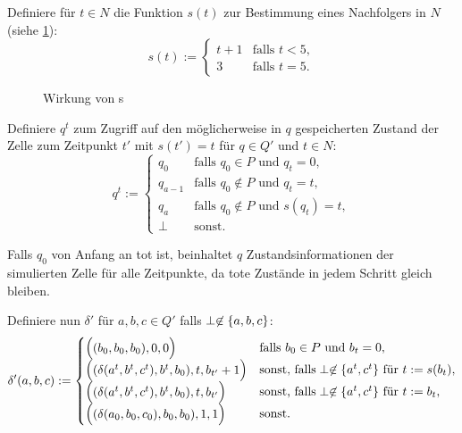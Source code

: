 \begin{definition}
    Definiere für $t \in N$ die Funktion $s(t)$ zur Bestimmung eines Nachfolgers in $N$ (siehe \cref{wirkungVonS}):
    \[
        s(t) :=
        \begin{cases}
            t + 1 & \text{falls } t < 5, \\
            3 & \text{falls } t = 5.
        \end{cases}
    \]
    
    \begin{figure}[h]
        \centering
        
        \caption{Wirkung von s}
        \label{wirkungVonS}
    \end{figure}
    
    
    Definiere $q^t$ zum Zugriff auf den möglicherweise in $q$ gespeicherten Zustand der Zelle zum Zeitpunkt $t'$ mit $s(t') = t$
    für $q \in Q'$ und $t \in N$:
    \[
        q^{t} :=
        \begin{cases}
            q_{0} & \text{falls } q_0 \in P \text{ und } q_t = 0, \\
            q_{a-1} & \text{falls } q_0 \not\in P \text{ und } q_t = t, \\
            q_a & \text{falls } q_0 \not\in P \text{ und } s(q_t) = t, \\
            \perp & \text{sonst.}
        \end{cases}
    \]
    
    Falls $q_0$ von Anfang an tot ist,
    beinhaltet $q$ Zustandsinformationen
    der simulierten Zelle für alle Zeitpunkte,
    da tote Zustände in jedem Schritt gleich bleiben.
    
    Definiere nun $\delta'$ für $a, b, c \in Q'$ falls $\perp \not\in \{ { a, b, c} \}$:
    \[
        \delta'(a, b, c) := 
        \begin{cases}
            \Spvek{(b_0, b_0, b_0), 0, 0}
            & \text{falls } b_0 \in P \text{ und } b_t = 0, \\
            \Spvek{(\delta(a^t, b^t, c^t), b^t, b_0), t, b_{t'} + 1}
            & \text{sonst, falls} \perp \not\in \finset{ a^t, c^t } \text{ für } t := s(b_t), \\
            \Spvek{(\delta(a^t, b^t, c^t), b^t, b_0), t, b_{t'}}
            & \text{sonst, falls} \perp \not\in \finset{a^t, c^t} \text{ für } t := b_t, \\
            \Spvek{(\delta(a_0, b_0, c_0), b_0, b_0), 1, 1}
            & \text{sonst.}
        \end{cases}
    \]
    

\end{definition}
